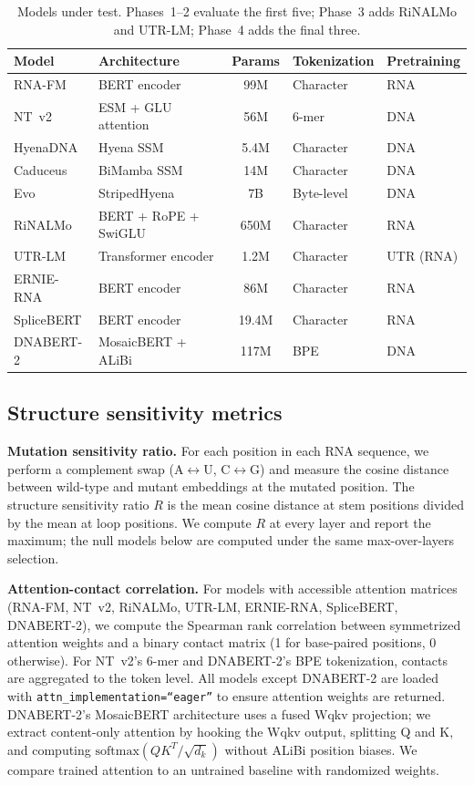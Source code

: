 \documentclass[11pt]{article}
\begin{document}
\begin{table}[t]
\centering
\caption{Models under test.  Phases~1--2 evaluate the first five;
  Phase~3 adds RiNALMo and UTR-LM; Phase~4 adds the final three.}
\label{tab:models}
\small
\begin{tabular}{@{}llcll@{}}
\toprule
\textbf{Model} & \textbf{Architecture} & \textbf{Params} &
  \textbf{Tokenization} & \textbf{Pretraining} \\
\midrule
RNA-FM     & BERT encoder          & 99M  & Character  & RNA \\
NT~v2      & ESM + GLU attention   & 56M  & 6-mer      & DNA \\
HyenaDNA   & Hyena SSM             & 5.4M & Character  & DNA \\
Caduceus   & BiMamba SSM           & 14M  & Character  & DNA \\
Evo        & StripedHyena          & 7B   & Byte-level & DNA \\
\midrule
RiNALMo    & BERT + RoPE + SwiGLU  & 650M & Character  & RNA \\
UTR-LM     & Transformer encoder   & 1.2M & Character  & UTR (RNA) \\
\midrule
ERNIE-RNA  & BERT encoder          & 86M  & Character  & RNA \\
SpliceBERT & BERT encoder          & 19.4M & Character & RNA \\
DNABERT-2  & MosaicBERT + ALiBi    & 117M & BPE        & DNA \\
\bottomrule
\end{tabular}
\end{table}

\subsection{Structure sensitivity metrics}
\label{sec:metrics}

\textbf{Mutation sensitivity ratio.}  For each position in each RNA
sequence, we perform a complement swap (A$\leftrightarrow$U,
C$\leftrightarrow$G) and measure the cosine distance between
wild-type and mutant embeddings at the mutated position.  The
structure sensitivity ratio $R$ is the mean cosine distance at stem
positions divided by the mean at loop positions.  We compute $R$ at
every layer and report the maximum; the null models below are computed
under the same max-over-layers selection.

\textbf{Attention-contact correlation.}  For models with accessible
attention matrices (RNA-FM, NT~v2, RiNALMo, UTR-LM, ERNIE-RNA,
SpliceBERT, DNABERT-2), we compute the Spearman rank correlation
between symmetrized attention weights and a binary contact matrix (1
for base-paired positions, 0 otherwise).  For NT~v2's 6-mer and
DNABERT-2's BPE tokenization, contacts are aggregated to the token
level.  All models except DNABERT-2 are loaded with
\texttt{attn\_implementation=``eager''} to ensure attention weights
are returned.  DNABERT-2's MosaicBERT architecture uses a fused Wqkv
projection; we extract content-only attention by hooking the Wqkv
output, splitting Q and K, and computing
$\mathrm{softmax}(QK^T/\sqrt{d_k})$ without ALiBi position biases.
We compare trained attention to an untrained baseline with
randomized weights.
\end{document}
